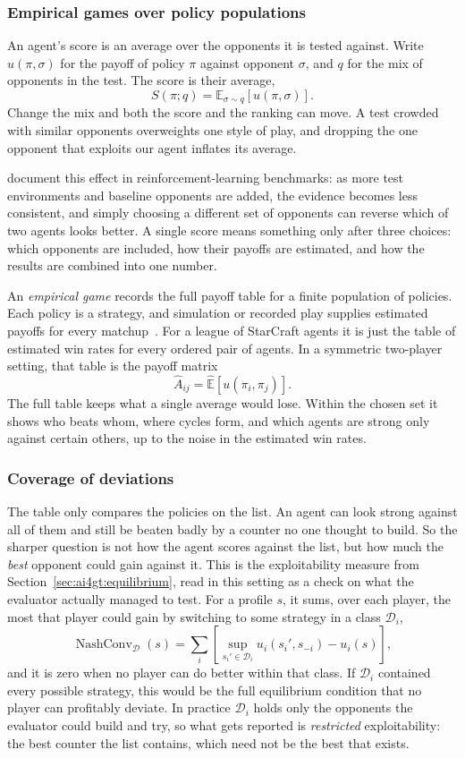 \subsubsection{Empirical games over policy populations}
An agent's score is an average over the opponents it is tested against. Write
\(u(\pi,\sigma)\) for the payoff of policy \(\pi\) against opponent \(\sigma\), and
\(q\) for the mix of opponents in the test. The score is their average,
\[
S(\pi;q)
=
\mathbb{E}_{\sigma\sim q}
\left[
u(\pi,\sigma)
\right].
\]
Change the mix and both the score and the ranking can move. A test crowded with
similar opponents overweights one style of play, and dropping the one opponent that
exploits our agent inflates its average.

 document this effect in
reinforcement-learning benchmarks: as more test environments and baseline opponents are added, the evidence becomes less consistent, and simply choosing a different set of opponents can
reverse which of two agents looks better. A single score means
something only after three choices: which opponents are included, how their payoffs
are estimated, and how the results are combined into one number.

An \emph{empirical game} records the full payoff table for a finite population of
policies. Each policy is a strategy, and simulation or recorded play supplies
estimated payoffs for every matchup~\citep{Wellman2006}.
For a league of StarCraft agents it is just the table of estimated win rates for
every ordered pair of agents. In a symmetric two-player setting, that table is the payoff
matrix
\[
\widehat{A}_{ij}
=
\widehat{\mathbb{E}}
\left[
u(\pi_i,\pi_j)
\right].
\]
The full table keeps what a single average would lose. Within the chosen set
it shows who beats whom, where cycles form, and which agents are strong only
against certain others, up to the noise in the estimated win rates.

\subsubsection{Coverage of deviations}
The table only compares the policies on the list. An agent can look strong against
all of them and still be beaten badly by a counter no one thought to build. So the
sharper question is not how the agent scores against the list, but how much the
\emph{best} opponent could gain against it. This is the exploitability measure from Section~\ref{sec:ai4gt:equilibrium},
read in this setting as a check on what the evaluator actually managed to
test. For a profile \(s\), it sums, over each player, the most
that player could gain by switching to some strategy in a class \(\mathcal{D}_i\),
\[
\operatorname{NashConv}_{\mathcal{D}}(s)
=
\sum_i
\left[
\sup_{s_i'\in\mathcal{D}_i}
u_i(s_i',s_{-i})
-
u_i(s)
\right],
\]
and it is zero when no player can do better within that class. If \(\mathcal{D}_i\)
contained every possible strategy, this would be the full equilibrium condition that
no player can profitably deviate. In practice \(\mathcal{D}_i\) holds only the
opponents the evaluator could build and try, so what gets reported is \emph{restricted}
exploitability: the best counter the list contains, which need not be the best that
exists.

